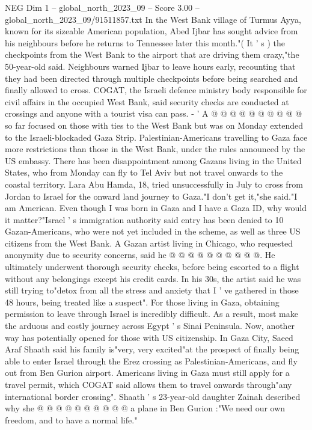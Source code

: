 \begin{textsample}{NEG Dim 1 – global\_north\_2023\_09 – Score 3.00 – global\_north\_2023\_09/91511857.txt}
In the West Bank village of Turmus Ayya, known for its sizeable American population, Abed Ijbar has sought advice from his neighbours before he returns to Tennessee later this month."( It ' s ) the checkpoints from the West Bank to the airport that are driving them crazy,"the 50-year-old said.
Neighbours warned Ijbar to leave hours early, recounting that they had been directed through multiple checkpoints before being searched and finally allowed to cross.
COGAT, the Israeli defence ministry body responsible for civil affairs in the occupied West Bank, said security checks are conducted at crossings and anyone with a tourist visa can pass. - ' A @ @ @ @ @ @ @ @ @ @ so far focused on those with ties to the West Bank but was on Monday extended to the Israeli-blockaded Gaza Strip.
Palestinian-Americans travelling to Gaza face more restrictions than those in the West Bank, under the rules announced by the US embassy.
There has been disappointment among Gazans living in the United States, who from Monday can fly to Tel Aviv but not travel onwards to the coastal territory.
Lara Abu Hamda, 18, tried unsuccessfully in July to cross from Jordan to Israel for the onward land journey to Gaza."I don't get it,"she said."I am American.
Even though I was born in Gaza and I have a Gaza ID, why would it matter?"Israel ' s immigration authority said entry has been denied to 10 Gazan-Americans, who were not yet included in the scheme, as well as three US citizens from the West Bank.
A Gazan artist living in Chicago, who requested anonymity due to security concerns, said he @ @ @ @ @ @ @ @ @ @.
He ultimately underwent thorough security checks, before being escorted to a flight without any belongings except his credit cards.
In his 30s, the artist said he was still trying to"detox from all the stress and anxiety that I ' ve gathered in those 48 hours, being treated like a suspect".
For those living in Gaza, obtaining permission to leave through Israel is incredibly difficult.
As a result, most make the arduous and costly journey across Egypt ' s Sinai Peninsula.
Now, another way has potentially opened for those with US citizenship.
In Gaza City, Saeed Araf Shaath said his family is"very, very excited"at the prospect of finally being able to enter Israel through the Erez crossing as Palestinian-Americans, and fly out from Ben Gurion airport.
Americans living in Gaza must still apply for a travel permit, which COGAT said allows them to travel onwards through"any international border crossing".
Shaath ' s 23-year-old daughter Zainah described why she @ @ @ @ @ @ @ @ @ @ a plane in Ben Gurion :"We need our own freedom, and to have a normal life."

\end{textsample}
